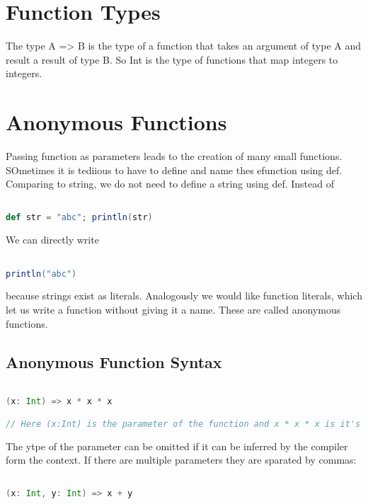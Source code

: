 \documentclass[10pt, a4paper]{report}
\begin{document}
\section{Function Types}

The type A => B is the type of a function that takes an argument of type A and result a result of type B. So Int is the type of functions that map integers to integers.

\section{Anonymous Functions}
Passing function as parameters leads to the creation of many small functions. SOmetimes it is tediious to have to define and name thes efunction using def. Comparing to string, we do not need to define a string using def. Instead of 

\begin{lstlisting}[language=scala]

def str = "abc"; println(str)

\end{lstlisting}

We can directly write

\begin{lstlisting}[language=scala]

println("abc")

\end{lstlisting}

because strings exist as literals. Analogously we would like function literals, which let us write a function without giving it a name. These are called anonymous functions.

\subsection{Anonymous Function Syntax}

\begin{lstlisting}[language=scala]

(x: Int) => x * x * x

// Here (x:Int) is the parameter of the function and x * x * x is it's body.

\end{lstlisting}

The ytpe of the parameter can be omitted if it can be inferred by the compiler form the context. If there are multiple parameters they are sparated by commas:

\begin{lstlisting}[language=scala]

(x: Int, y: Int) => x + y

\end{lstlisting}
\end{document}
